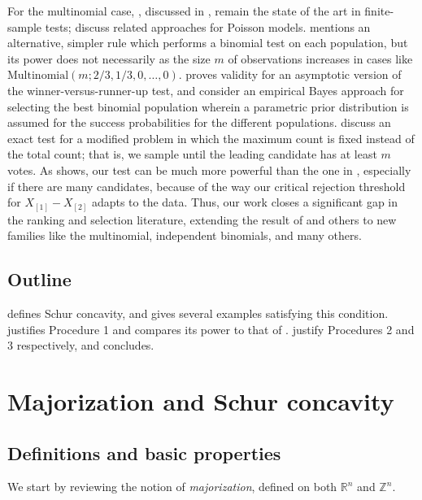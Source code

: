\documentclass[11pt]{article}
\theoremstyle{definition}
\theoremstyle{custom}
\newcommand{\RR}{\mathbb{R}}
\newcommand{\ZZ}{\mathbb{Z}}
\begin{document}
For the multinomial case, \citet{Gupta:1967wg}, discussed in , remain the state of the art in finite-sample tests; \citet{Gupta:1976vd} discuss related approaches for Poisson models. \citet{Berger:1980ev} mentions an alternative, simpler rule which performs a binomial test on each population, but its power does not necessarily as the size $m$ of observations increases in cases like $\text{Multinomial}(m; 2/3, 1/3, 0, \ldots, 0)$. \citet{Nettleton:2009ht} proves validity for an asymptotic version of the winner-versus-runner-up test, and \citet{Gupta:1989fe} consider an empirical Bayes approach for selecting the best binomial population wherein a parametric prior distribution is assumed for the success probabilities for the different populations. \citet{Ng:2007cn} discuss an exact test for a modified problem in which the maximum count is fixed instead of the total count; that is, we sample until the leading candidate has at least $m$ votes. As  shows, our test can be much more powerful than the one in \citet{Gupta:1967wg}, especially if there are many candidates, because of the way our critical rejection threshold for $X_{[1]} - X_{[2]}$ adapts to the data. Thus, our work closes a significant gap in the ranking and selection literature, extending the result of \citet{Gutmann:1987fk} and others to new families like the multinomial, independent binomials, and many others.

\subsection{Outline}

 defines Schur concavity, and gives several examples satisfying this condition.  justifies Procedure 1 and compares its power to that of \citet{Gupta:1967wg}.  justify Procedures 2 and 3 respectively, and  concludes.

\section{Majorization and Schur concavity}
\label{sec:maj}

\subsection{Definitions and basic properties}

We start by reviewing the notion of {\em majorization}, defined on both $\RR^n$ and $\ZZ^n$.
\end{document}
